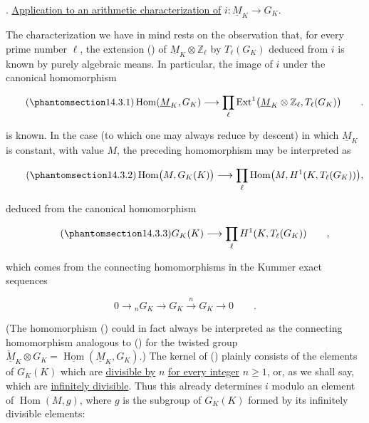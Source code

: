 \par\medskip
\noindent
{}. \underline{Application to an arithmetic characterization of}
$i:\underline M_K\longrightarrow G_K$.

The characterization we have in mind rests on the observation that,
for every prime number $\ell$, the extension () of
$\underline M_K\otimes\mathbb Z_\ell$ by $T_\ell(G_K)$ deduced from
$i$ is known by purely algebraic means.  In particular, the image of
$i$ under the canonical homomorphism

\begin{equation}\tag{\SGARefTarget{sga7.sga7i.eix.n14-3-1}{14.3.1}}
 \operatorname{Hom}(\underline M_K,G_K)\longrightarrow
 \prod_\ell\operatorname{Ext}^1
 \bigl(\underline M_K\otimes\mathbb Z_\ell,T_\ell(G_K)\bigr)
 \qquad .
\end{equation}

\noindent
is known.  In the case (to which one may always reduce by descent) in
which $\underline M_K$ is constant, with value $M$, the preceding
homomorphism may be interpreted as

\begin{equation}\tag{\SGARefTarget{sga7.sga7i.eix.n14-3-2}{14.3.2}}
 \operatorname{Hom}\bigl(M,G_K(K)\bigr)\longrightarrow
 \prod_\ell\operatorname{Hom}
 \bigl(M,H^1(K,T_\ell(G_K))\bigr),
\end{equation}

\noindent
deduced from the canonical homomorphism

\begin{equation}\tag{\SGARefTarget{sga7.sga7i.eix.n14-3-3}{14.3.3}}
 G_K(K)\longrightarrow\prod_\ell H^1(K,T_\ell(G_K))
 \qquad ,
\end{equation}

\noindent
which comes from the connecting homomorphisms in the Kummer exact
sequences

\begin{equation*}
 0\longrightarrow{}_nG_K\longrightarrow G_K
 \xrightarrow{\ n\ }G_K\longrightarrow0\qquad .
\end{equation*}

(The homomorphism () could in fact always be interpreted as the
connecting homomorphism analogous to () for the twisted group
$\check{\underline M}_K\otimes G_K=
\underline{\operatorname{Hom}}(\underline M_K,G_K)$.)  The kernel of
() plainly consists of the elements of $G_K(K)$ which are
\underline{divisible by} $n$ \underline{for every integer}
$n\geq1$, or, as we shall say, which are \underline{infinitely
divisible}.  Thus this already determines $i$ modulo an element of
$\operatorname{Hom}(M,g)$, where $g$ is the subgroup of $G_K(K)$
formed by its infinitely divisible elements:

